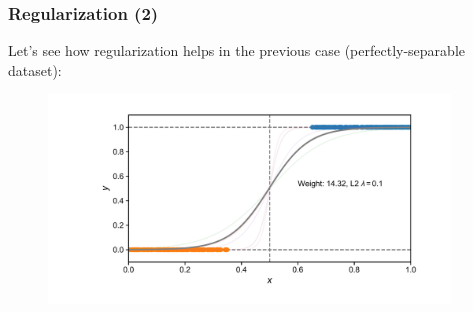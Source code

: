 \documentclass[10pt,aspectratio=169]{beamer}
\begin{document}
      \begin{frame}
        \frametitle{Regularization (2)}
        Let's see how regularization helps in the previous case
        (perfectly-separable dataset):

        \begin{figure}[t]
          \includegraphics[width=0.95\textwidth]{scripts/perfect_sep_reg.pdf}
        \end{figure}
      \end{frame}
\end{document}
